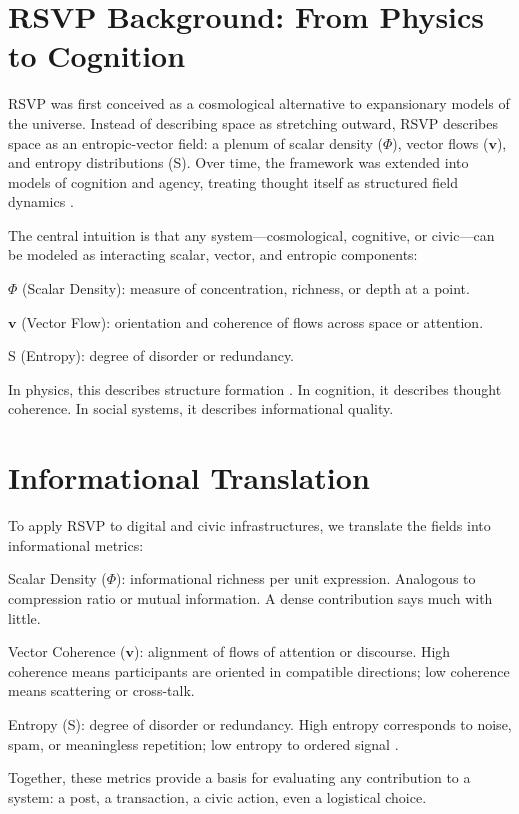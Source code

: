 \documentclass{book}
\begin{document}
\section{RSVP Background: From Physics to Cognition}

RSVP was first conceived as a cosmological alternative to expansionary models of the universe. Instead of describing space as stretching outward, RSVP describes space as an entropic-vector field: a plenum of scalar density (\(\Phi\)), vector flows (\(\mathbf{v}\)), and entropy distributions (S). Over time, the framework was extended into models of cognition and agency, treating thought itself as structured field dynamics \cite{barandes2023}.

The central intuition is that any system—cosmological, cognitive, or civic—can be modeled as interacting scalar, vector, and entropic components:

\(\Phi\) (Scalar Density): measure of concentration, richness, or depth at a point.

\(\mathbf{v}\) (Vector Flow): orientation and coherence of flows across space or attention.

S (Entropy): degree of disorder or redundancy.

In physics, this describes structure formation \cite{prigogine1984}. In cognition, it describes thought coherence. In social systems, it describes informational quality.

\section{Informational Translation}

To apply RSVP to digital and civic infrastructures, we translate the fields into informational metrics:

Scalar Density (\(\Phi\)): informational richness per unit expression. Analogous to compression ratio or mutual information. A dense contribution says much with little.

Vector Coherence (\(\mathbf{v}\)): alignment of flows of attention or discourse. High coherence means participants are oriented in compatible directions; low coherence means scattering or cross-talk.

Entropy (S): degree of disorder or redundancy. High entropy corresponds to noise, spam, or meaningless repetition; low entropy to ordered signal \cite{shannon1948}.

Together, these metrics provide a basis for evaluating any contribution to a system: a post, a transaction, a civic action, even a logistical choice.
\end{document}

